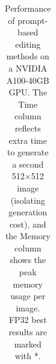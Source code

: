 \begin{table}[htbp]
{{\begin{tabular}{ccc}
    \bottomrule
    \end{tabular}
    }

    }
    \caption{
        Performance of prompt-based editing methods on a NVIDIA A100-40GB GPU. The Time column reflects extra time to generate a second 512×512 image (isolating generation cost), and the Memory column shows the peak memory usage per image. FP32 best results are marked with *.
}
            \label{tab:comparison_time}
    \end{table}


  